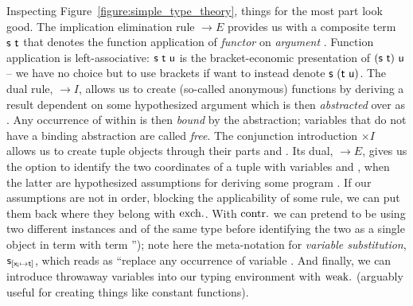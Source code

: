 Inspecting Figure~\ref{figure:simple_type_theory}, things for the most part look good.
The implication elimination rule $\to E$ provides us with a composite term $\mathsf{s~t}$ that denotes the function application of \textit{functor}  on \textit{argument} .
Function application is left-associative: $\mathsf{s~t~u}$ is the bracket-economic presentation of $(\mathsf{s~t})~\mathsf{u}$ -- we have no choice but to use brackets if want to instead denote $\mathsf{s}~(\mathsf{t~u})$.
The dual rule, $\to I$, allows us to create (so-called anonymous) functions by deriving a result  dependent on some hypothesized argument  which is then \textit{abstracted} over as .
Any occurrence of  within  is then \textit{bound} by the abstraction; variables that do not have a binding abstraction are called \textit{free}.
The conjunction introduction $\times I$ allows us to create tuple objects  through their parts  and .
Its dual, $\to E$, gives us the option to identify the two coordinates of a tuple  with variables  and , when the latter are hypothesized assumptions for deriving some program .
If our assumptions are not in order, blocking the applicability of some rule, we can put them back where they belong with $\mathrm{exch.}{}$.
With $\mathrm{contr.}{}$ we can pretend to be using two different instances  and  of the same type before identifying the two as a single object  in term  with term '');
note here the meta-notation for \textit{variable substitution}, $\mathsf{s}_{[\mathsf{x_i} \mapsto \mathsf{t}]}$, which reads as ``replace any occurrence of variable .
And finally, we can introduce throwaway variables into our typing environment with $\mathrm{weak.}{}$ (arguably useful for creating things like constant functions).

